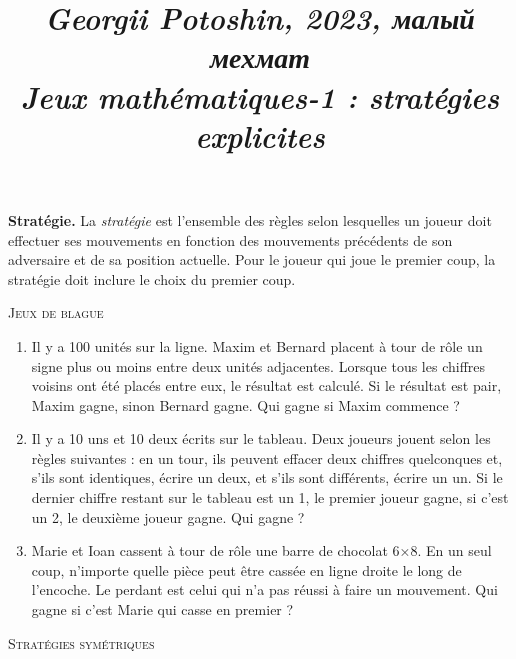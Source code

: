 \documentclass{article}
\title{
\textit{\small{Georgii Potoshin, 2023, малый мехмат}}\\
\vspace{0.3ex}
\textit{\huge{Jeux mathématiques-1 : stratégies explicites}}\vspace{1ex}
}
\date{\vspace{-8ex}}
\begin{document}
\maketitle

\textbf{Stratégie.} La \emph{stratégie} est l'ensemble des règles selon lesquelles un joueur doit effectuer ses mouvements en fonction des mouvements précédents de son adversaire et de sa position actuelle. Pour le joueur qui joue le premier coup, la stratégie doit inclure le choix du premier coup. 
\par
\vspace{3ex}
\begin{center}\textsc{\Large{Jeux de blague}}\end{center}
\begin{enumerate}
    \item Il y a 100 unités sur la ligne. Maxim et Bernard placent à tour de rôle un signe plus ou moins entre deux unités adjacentes. Lorsque tous les chiffres voisins ont été placés entre eux, le résultat est calculé. Si le résultat est pair, Maxim gagne, sinon Bernard gagne. Qui gagne si Maxim commence ?
    \item Il y a 10 uns et 10 deux écrits sur le tableau. Deux joueurs jouent selon les règles suivantes : en un tour, ils peuvent effacer deux chiffres quelconques et, s'ils sont identiques, écrire un deux, et s'ils sont différents, écrire un un. Si le dernier chiffre restant sur le tableau est un 1, le premier joueur gagne, si c'est un 2, le deuxième joueur gagne. Qui gagne ?
	\item Marie et Ioan cassent à tour de rôle une barre de chocolat 6×8. En un seul coup, n'importe quelle pièce peut être cassée en ligne droite le long de l'encoche. Le perdant est celui qui n'a pas réussi à faire un mouvement. Qui gagne si c'est Marie qui casse en premier ?
\end{enumerate}
\vspace{1ex}
\begin{center}\textsc{\Large{Stratégies symétriques}}\end{center}
\end{document}
